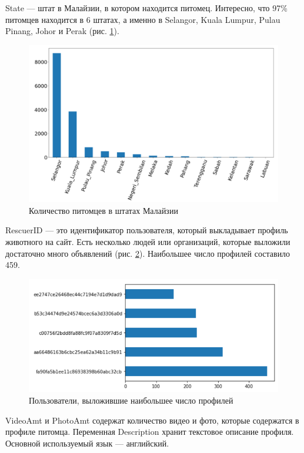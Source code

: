\documentclass[14pt]{mmcs_article}
\begin{document}
State --- штат в Малайзии, в котором находится питомец. Интересно, что 97\% питомцев находится в 6 штатах, а именно в Selangor, Kuala Lumpur, Pulau Pinang, Johor и Perak (рис. \ref{analyse:state}).

\begin{figure}[H]
	\centering
	\includegraphics[scale=0.5]{state.png}
	\caption{Количество питомцев в штатах Малайзии}\label{analyse:state}
\end{figure}

RescuerID --- это идентификатор пользователя, который выкладывает профиль животного на сайт. Есть несколько людей или организаций, которые выложили достаточно много объявлений (рис. \ref{analyse:rescuer}). Наибольшее число профилей составило 459.

\begin{figure}[H]
	\centering
	\includegraphics[scale=0.8]{rescuer.png}
	\caption{Пользователи, выложившие наибольшее число профилей}\label{analyse:rescuer}
\end{figure}

VideoAmt и PhotoAmt содержат количество видео и фото, которые содержатся в профиле питомца.
Переменная Description хранит текстовое описание профиля. Основной используемый язык --- английский.
\end{document}
